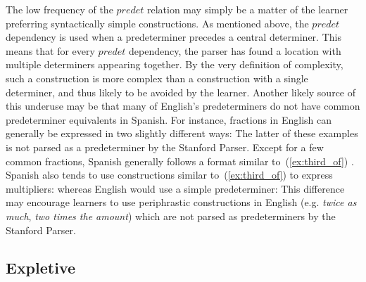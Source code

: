 \documentclass[main.tex]{subfiles}
\begin{document}
The low frequency of the $predet$ relation may simply be a matter of the learner preferring syntactically simple constructions. As mentioned above, the $predet$ dependency is used when a predeterminer precedes a central determiner. This means that for every $predet$ dependency, the parser has found a location with multiple determiners appearing together. By the very definition of complexity, such a construction is more complex than a construction with a single determiner, and thus likely to be avoided by the learner. Another likely source of this underuse may be that many of English's predeterminers do not have common predeterminer equivalents in Spanish. For instance, fractions in English can generally be expressed in two slightly different ways:
The latter of these examples is not parsed as a predeterminer by the Stanford Parser. Except for a few common fractions, Spanish generally follows a format similar to~(\ref{ex:third_of}) \citep[Ch. 10.10]{butt}. Spanish also tends to use constructions similar to~(\ref{ex:third_of}) to express multipliers:
whereas English would use a simple predeterminer:
This difference may encourage learners to use periphrastic constructions in English (e.g. \textit{twice as much}, \textit{two times the amount}) which are not parsed as predeterminers by the Stanford Parser.

\subsection{Expletive}
\end{document}
